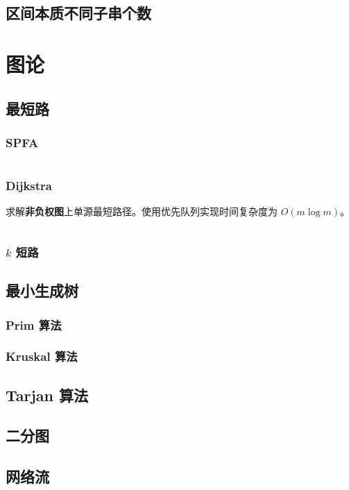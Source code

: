 \documentclass[a4paper, twoside]{article}
\begin{document}
\subsection{区间本质不同子串个数}

\newpage
\section{图论}
\subsection{最短路}
    \subsubsection{SPFA}
    \inputminted{cpp}{../src/图论/SPFA.cpp}

    \subsubsection{Dijkstra}
    求解\textbf{非负权图}上单源最短路径。使用优先队列实现时间复杂度为 $O(m \log m)$。
    \inputminted{cpp}{../src/图论/Dijkstra.cpp}

    \subsubsection{$k$ 短路}

\subsection{最小生成树}
    \subsubsection{Prim 算法}

    \subsubsection{Kruskal 算法}

\subsection{Tarjan 算法}

\subsection{二分图}

\subsection{网络流}
\end{document}
